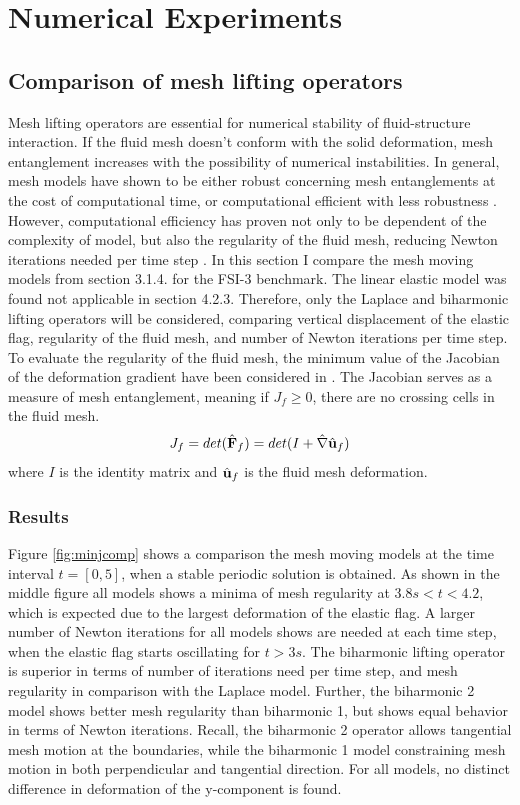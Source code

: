  \chapter{Numerical Experiments}
\section{Comparison of mesh lifting operators}
Mesh lifting operators are essential for numerical stability of fluid-structure interaction. If the fluid mesh doesn't conform with the solid deformation, mesh entanglement increases with the possibility of numerical instabilities. In general, mesh models have shown to be either robust concerning mesh entanglements at the cost of computational time, or computational efficient with less robustness \cite{MM2016}. However, computational efficiency has proven not only to be dependent of the complexity of model, but also the regularity of the fluid mesh, reducing Newton iterations needed per time step \cite{Wickb}. In this section I compare the mesh moving models from section 3.1.4. for the FSI-3 benchmark. The linear elastic model was found not applicable in section 4.2.3. Therefore, only the Laplace and biharmonic lifting operators will be considered, comparing vertical displacement of the elastic flag, regularity of the fluid mesh, and number of Newton iterations per time step. To evaluate the regularity of the fluid mesh, the minimum value of the Jacobian of the deformation gradient have been considered in \cite{Wickb}. The Jacobian serves as a measure of mesh entanglement, meaning if $J_f \geq 0$, there are no crossing cells in the fluid mesh. 
\begin{align*}
{J}_f = det(\hat{\mathbf{F}}_f) =  det(I + \hat{\nabla} \hat{\mathbf{u}}_f)
\end{align*}
where $I$ is the identity matrix and $ \hat{\mathbf{u}}_f$ is the fluid mesh deformation.  
\newpage

\subsection*{Results}
Figure \ref{fig:minjcomp} shows a comparison the mesh moving models at the time interval  $t = [0, 5]$, when a stable periodic solution is obtained. As shown in the middle figure all models shows a minima of mesh regularity at $3.8s < t < 4.2$, which is expected due to the largest deformation of the elastic flag. A larger number of Newton iterations for all models shows are needed at each time step, when the elastic flag starts oscillating for $t > 3s$. The biharmonic lifting operator is superior in terms of number of iterations need per time step, and mesh regularity in comparison with the Laplace model. Further, the biharmonic 2 model shows better mesh regularity than biharmonic 1, but shows equal behavior in terms of Newton iterations. Recall, the biharmonic 2 operator allows tangential mesh motion at the boundaries, while the biharmonic 1 model constraining mesh motion in both perpendicular and tangential direction. For all models, no distinct difference in deformation of the y-component is found.

